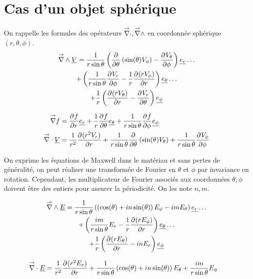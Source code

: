 \section{Cas d'un objet sphérique}


    On rappelle les formules des opérateurs $\vdiv, \vrot$ en coordonnée sphérique $(r,\theta,\phi)$.
    \begin{multline}
        \vrot \v{V} = \frac{1}{r\sin\theta}\left(\ddr{\theta}{}\left(\sin(\theta)V_\phi\right) - \ddr{\phi}{V_\theta}\right)\v{e_r}\dots 
        \\
        + \left(\frac{1}{r\sin\theta}\ddr{\phi}{V_r} - \frac{1}{r}\ddr{r}{(rV_\phi)} \right)\v{e_\theta} \dots
        \\
        + \frac{1}{r}\left(\ddr{r}{(rV_\theta)}-\ddr{\theta}{V_r}\right)\v{e_\phi}
    \end{multline}

    \begin{align}
        \vgrad f &= \ddr{r}{f}\v{e_r}
        +\frac{1}{r}\ddr{\theta}{f}\v{e_\theta} + \frac{1}{r\sin\theta}\ddr{\phi}{f}\v{e_\phi}
        \\
        \vdiv \v{V} &= \frac{1}{r^2}\ddr{r}{(r^2V_r)}
        + \frac{1}{r\sin\theta}\ddr{\theta}{}\left(\sin(\theta)V_\theta\right) + \frac{1}{r\sin\theta}\ddr{\phi}{V_\phi}
    \end{align}

    On exprime les équations de Maxwell dans le matériau et sans pertes de généralité, on peut réaliser une transformée de Fourier en $\theta$ et $\phi$ par invariance en rotation. Cependant, les multiplicateur de Fourier associés aux coordonnées $\theta,\phi$ doivent être des entiers pour assurer la périodicité. On les note $n,m$.

    \begin{multline}
        \vrot \v{E} = \frac{1}{r\sin\theta}\left(\left(\cos(\theta) + in\sin(\theta)\right)E_\phi - im E_\theta\right)\v{e_r}\dots 
        \\
        + \left(\frac{im}{r\sin\theta}E_r - \frac{1}{r}\ddr{r}{(rE_\phi)} \right)\v{e_\theta} \dots
        \\
        + \frac{1}{r}\left(\ddr{r}{(rE_\theta)}-inE_r\right)\v{e_\phi}
    \end{multline}

    \begin{align}
        \vdiv \v{E} &= \frac{1}{r^2}\ddr{r}{(r^2E_r)}
        + \frac{1}{r\sin\theta}\left(\cos(\theta) + in\sin(\theta)\right)E_\theta + \frac{im}{r\sin\theta}{E_\phi}
    \end{align}

